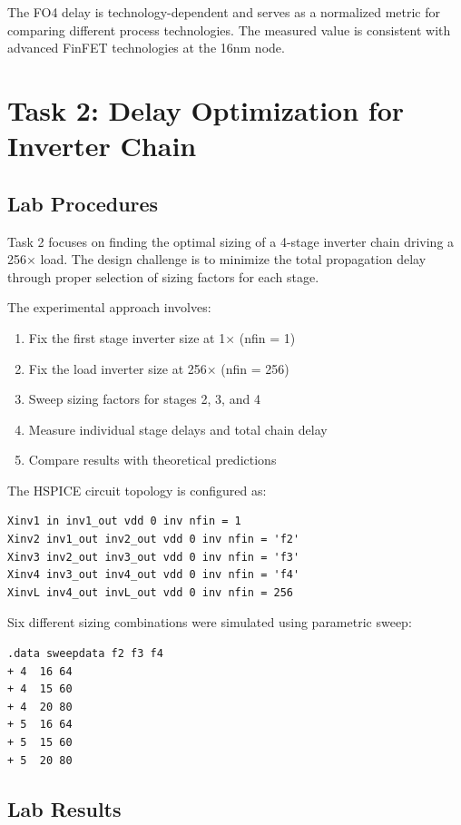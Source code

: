 \documentclass[UTF8,12pt,a4paper]{ctexart}
\begin{document}
The FO4 delay is technology-dependent and serves as a normalized metric for comparing different process technologies. The measured value is consistent with advanced FinFET technologies at the 16nm node.

\section{Task 2: Delay Optimization for Inverter Chain}

\subsection{Lab Procedures}

Task 2 focuses on finding the optimal sizing of a 4-stage inverter chain driving a 256× load. The design challenge is to minimize the total propagation delay through proper selection of sizing factors for each stage.

The experimental approach involves:

\begin{enumerate}
    \item Fix the first stage inverter size at 1× (nfin = 1)
    \item Fix the load inverter size at 256× (nfin = 256)
    \item Sweep sizing factors for stages 2, 3, and 4
    \item Measure individual stage delays and total chain delay
    \item Compare results with theoretical predictions
\end{enumerate}

The HSPICE circuit topology is configured as:

\begin{verbatim}
Xinv1 in inv1_out vdd 0 inv nfin = 1
Xinv2 inv1_out inv2_out vdd 0 inv nfin = 'f2'
Xinv3 inv2_out inv3_out vdd 0 inv nfin = 'f3'
Xinv4 inv3_out inv4_out vdd 0 inv nfin = 'f4'
XinvL inv4_out invL_out vdd 0 inv nfin = 256
\end{verbatim}

Six different sizing combinations were simulated using parametric sweep:

\begin{verbatim}
.data sweepdata f2 f3 f4
+ 4  16 64
+ 4  15 60
+ 4  20 80
+ 5  16 64
+ 5  15 60
+ 5  20 80
\end{verbatim}

\subsection{Lab Results}
\end{document}
